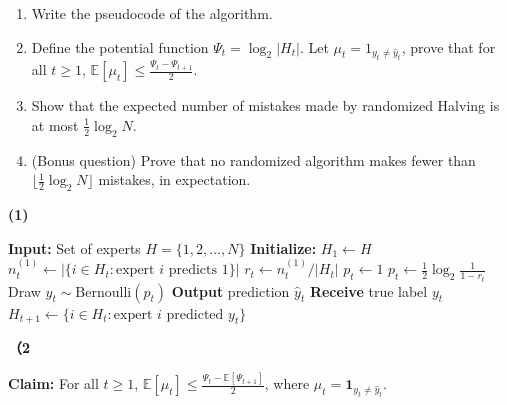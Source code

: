 \documentclass[letterpaper, 11pt]{article}
\newcommand{\1}{\mathds{1}}	%
\theoremstyle{definition}
\begin{document}
\begin{enumerate}
    \item Write the pseudocode of the algorithm.
    
    \item Define the potential function $\Psi_t = \log_2 |H_t|$. Let $\mu_t = 1_{y_t \neq \widehat{y}_t}$, prove that for all $t \geq 1$, $\mathbb{E}[\mu_t] \leq \frac{\Psi_t - \Psi_{t+1}}{2}$.
    
    \item Show that the expected number of mistakes made by randomized Halving is at most $\frac{1}{2} \log_2 N$.
    
    \item (Bonus question) Prove that no randomized algorithm makes fewer than $\lfloor \frac{1}{2} \log_2 N \rfloor$ mistakes, in expectation.
\end{enumerate}

\textbf{(1)}

\begin{algorithm}[H]
\caption{Randomized Halving}
\begin{algorithmic}[1]
\STATE \textbf{Input:} Set of experts $H = \{1, 2, \ldots, N\}$
\STATE \textbf{Initialize:} $H_1 \leftarrow H$
    \STATE $n_t^{(1)} \leftarrow |\{i \in H_t : \text{expert } i \text{ predicts } 1\}|$
    \STATE $r_t \leftarrow n_t^{(1)} / |H_t|$ 
        \STATE $p_t \leftarrow 1$
    \ELSE
        \STATE $p_t \leftarrow \frac{1}{2} \log_2 \frac{1}{1 - r_t}$
    \ENDIF
    \STATE Draw $\widehat{y}_t \sim \text{Bernoulli}(p_t)$ 
    \STATE \textbf{Output} prediction $\widehat{y}_t$
    \STATE \textbf{Receive} true label $y_t$
    \STATE $H_{t+1} \leftarrow \{i \in H_t : \text{expert } i \text{ predicted } y_t\}$ 
\ENDFOR
\end{algorithmic}
\end{algorithm}

\textbf{（2}

\textbf{Claim:} For all $t \geq 1$, $\mathbb{E}[\mu_t] \leq \frac{\Psi_t - \mathbb{E}[\Psi_{t+1}]}{2}$, where $\mu_t = \mathbf{1}_{y_t \neq \widehat{y}_t}$.
\end{document}
